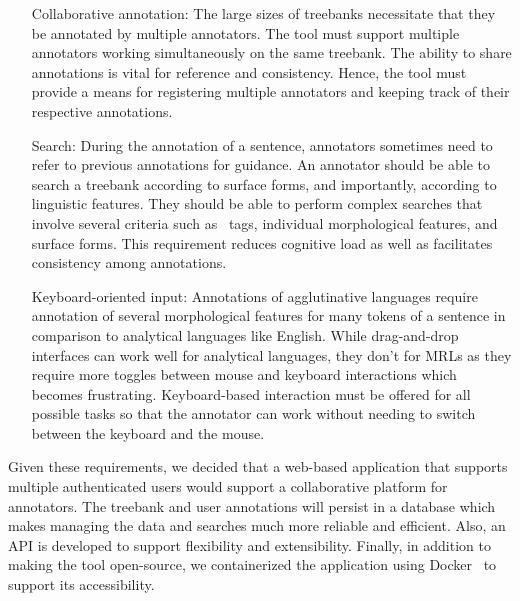 \begin{itemize}[before=\normalfont, font=\itshape, align=left,noitemsep,topsep=0pt,parsep=3pt,partopsep=0pt,labelsep=3pt,align=left]
    \item[Collaborative annotation:]
        The large sizes of treebanks necessitate that they be annotated by multiple annotators.
        The tool must support multiple annotators working simultaneously on the same treebank.
        The ability to share annotations is vital for reference and consistency.
        Hence, the tool must provide a means for registering multiple annotators and keeping track of their respective annotations.
    \item[Search:]
        During the annotation of a sentence, annotators sometimes need to refer to previous annotations for guidance.
        An annotator should be able to search a treebank according to surface forms, and importantly, according to linguistic features.
        They should be able to perform complex searches that involve several criteria such as \ud\ tags, individual morphological features, and surface forms.
        This requirement reduces cognitive load as well as facilitates consistency among annotations.
    \item[Keyboard-oriented input:]
        Annotations of agglutinative languages require annotation of several morphological features for many tokens of a sentence in comparison to analytical languages like English.
        While drag-and-drop interfaces can work well for analytical languages, they don't for MRLs as they require more toggles between mouse and keyboard interactions which becomes frustrating.
        Keyboard-based interaction must be offered for all possible tasks so that the annotator can work without needing to switch between the keyboard and the mouse.
\end{itemize}

Given these requirements, we decided that a web-based application that supports multiple authenticated users would support a collaborative platform for annotators.
The treebank and user annotations will persist in a database which makes managing the data and searches much more reliable and efficient.
Also, an API is developed to support flexibility and extensibility.
Finally, in addition to making the tool open-source, we containerized the application using Docker~\cite{docker} to support its accessibility.
